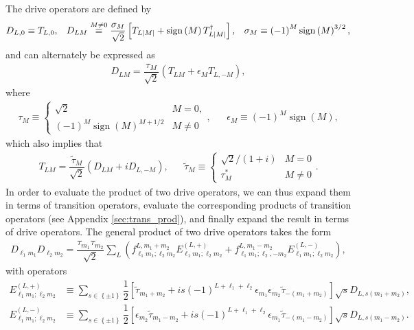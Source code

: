 \documentclass[nofootinbib,notitlepage,11pt]{revtex4-2}
\newcommand{\f}[2]{\dfrac{#1}{#2}} %
\newcommand{\p}[1]{\left(#1\right)} %
\renewcommand{\sp}[1]{\left[#1\right]} %
\renewcommand{\set}[1]{\left\{#1\right\}} %
\newcommand{\1}{\mathds{1}}
\DeclareMathOperator{\sign}{sign}
\begin{document}
The drive operators are defined by
\begin{align}
  D_{L,0} \equiv T_{L,0},
  &&
  D_{LM} \stackrel{M\ne0}{\equiv} \f{\sigma_M}{\sqrt{2}}
  \sp{T_{L\abs{M}} + \sign\p{M}T_{L\abs{M}}^\dag},
  &&
  \sigma_M \equiv \p{-1}^M \sign\p{M}^{3/2},
\end{align}
and can alternately be expressed as
\begin{align}
  D_{LM} = \f{\tau_M}{\sqrt{2}} \p{T_{LM} + \epsilon_M T_{L,-M}},
\end{align}
where
\begin{align}
  \tau_M \equiv
  \begin{cases}
    \sqrt{2} & M = 0, \\
    \p{-1}^M \sign\p{M}^{M+1/2} & M \ne 0
  \end{cases},
  &&
  \epsilon_M \equiv \p{-1}^M \sign\p{M},
\end{align}
which also implies that
\begin{align}
  T_{LM} = \f{\tilde\tau_M}{\sqrt{2}} \p{D_{LM} + i D_{L,-M}},
  &&
  \tilde\tau_M \equiv
  \begin{cases}
    \sqrt{2}/\p{1+i} & M = 0 \\
    \tau_M^* & M \ne 0
  \end{cases}.
\end{align}
In order to evaluate the product of two drive operators, we can thus
expand them in terms of transition operators, evaluate the
corresponding products of transition operators (see Appendix
\ref{sec:trans_prod}), and finally expand the result in terms of drive
operators.  The general product of two drive operators takes the form
\begin{align}
  D_{\ell_1 m_1} D_{\ell_2 m_2}
  = \f{\tau_{m_1}\tau_{m_2}}{\sqrt{2}}
  \sum_L \p{f_{\ell_1 m_1;\ell_2 m_2}^{L,m_1+m_2}
    E_{\ell_1 m_1;\ell_2 m_2}^{(L,+)}
    + f_{\ell_1 m_1;\ell_2,-m_2}^{L,m_1-m_2}
    E_{\ell_1 m_1;\ell_2 m_2}^{(L,-)}},
\end{align}
with operators
\begin{align}
  E_{\ell_1 m_1;\ell_2 m_2}^{(L,+)}
  &\equiv \sum_{s\in\set{\pm1}}
  \f12 \sp{\tilde\tau_{m_1+m_2}
    + i s \p{-1}^{L+\ell_1+\ell_2}
    \epsilon_{m_1} \epsilon_{m_2} \tilde\tau_{-\p{m_1+m_2}}}
  \sqrt{s} D_{L,s\p{m_1+m_2}},
  \\
  E_{\ell_1 m_1;\ell_2 m_2}^{(L,-)}
  &\equiv \sum_{s\in\set{\pm1}}
  \f12 \sp{\epsilon_{m_2} \tilde\tau_{m_1-m_2}
    + i s \p{-1}^{L+\ell_1+\ell_2}
    \epsilon_{m_1} \tilde\tau_{-\p{m_1-m_2}}}
  \sqrt{s} D_{L,s\p{m_1-m_2}}.
\end{align}
\end{document}
